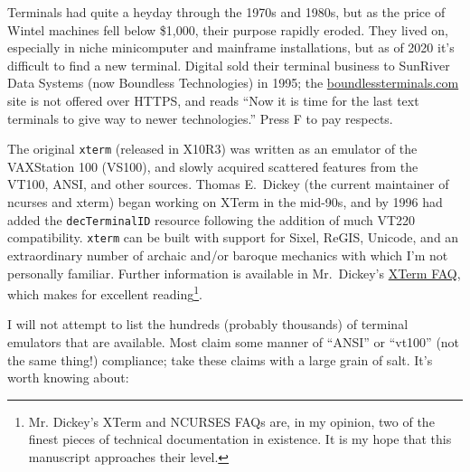 Terminals had quite a heyday through the 1970s and 1980s, but as the price of
Wintel machines fell below \$1,000, their purpose rapidly eroded. They lived on,
especially in niche minicomputer and mainframe installations, but as of 2020 it's
difficult to find a new terminal. Digital sold their terminal business to SunRiver
Data Systems (now Boundless Technologies) in 1995; the \url{boundlessterminals.com}
site is not offered over HTTPS, and reads ``Now it is time for the last text
terminals to give way to newer technologies\cite{boundless}.'' Press F to pay
respects.

The original \texttt{xterm} (released in X10R3) was written as an emulator of
the VAXStation 100 (VS100), and slowly acquired scattered features from the
VT100, ANSI, and other sources\cite{xtermfaq}. Thomas E.\ Dickey (the current
maintainer of \Gls{ncurses} and xterm) began working on XTerm in the mid-90s,
and by 1996 had added the \texttt{decTerminalID} resource following the
addition of much VT220 compatibility. \texttt{xterm} can be built with support
for Sixel, ReGIS, Unicode, and an extraordinary number of archaic and/or
baroque mechanics with which I'm not personally familiar. Further information
is available in Mr.\ Dickey's
\href{https://invisible-island.net/xterm/xterm.faq.html}{XTerm FAQ}, which
makes for excellent reading\footnote{Mr. Dickey's XTerm and NCURSES FAQs are,
in my opinion, two of the finest pieces of technical documentation in
existence. It is my hope that this manuscript approaches their level.}.

I will not attempt to list the hundreds (probably thousands) of terminal
emulators that are available. Most claim some manner of ``ANSI'' or ``vt100''
(not the same thing!) compliance; take these claims with a large grain of salt.
It's worth knowing about:

